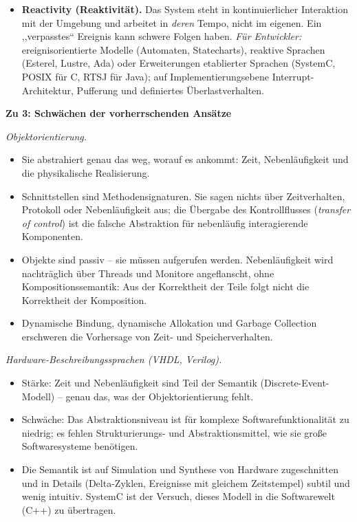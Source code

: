 \begin{loesung}
\begin{itemize}
          kontinuierliche und diskrete Anteile, synchrone und asynchrone Abläufe, blockierende und
          nichtblockierende Kommunikation, kontroll- und datenflussorientierte Sprachen.
          \emph{Für Entwickler:} Ein einziger Formalismus reicht nicht; erforderlich sind
          hierarchisch heterogene Modelle, eine sauber definierte Semantik an den Modellgrenzen und
          Co-Simulation.
    \item \textbf{Reactivity (Reaktivität).} Das System steht in kontinuierlicher Interaktion mit
          der Umgebung und arbeitet in \emph{deren} Tempo, nicht im eigenen. Ein ,,verpasstes``
          Ereignis kann schwere Folgen haben. \emph{Für Entwickler:} ereignisorientierte Modelle
          (Automaten, Statecharts), reaktive Sprachen (Esterel, Lustre, Ada) oder Erweiterungen
          etablierter Sprachen (SystemC, POSIX für C, RTSJ für Java); auf Implementierungsebene
          Interrupt-Architektur, Pufferung und definiertes Überlastverhalten.
\end{itemize}

\textbf{Zu 3: Schwächen der vorherrschenden Ansätze}

\emph{Objektorientierung.}
\begin{itemize}
    \item Sie abstrahiert genau das weg, worauf es ankommt: Zeit, Nebenläufigkeit und die
          physikalische Realisierung.
    \item Schnittstellen sind Methodensignaturen. Sie sagen nichts über Zeitverhalten, Protokoll
          oder Nebenläufigkeit aus; die Übergabe des Kontrollflusses (\emph{transfer of control})
          ist die falsche Abstraktion für nebenläufig interagierende Komponenten.
    \item Objekte sind passiv -- sie müssen aufgerufen werden. Nebenläufigkeit wird nachträglich
          über Threads und Monitore angeflanscht, ohne Kompositionssemantik: Aus der Korrektheit
          der Teile folgt nicht die Korrektheit der Komposition.
    \item Dynamische Bindung, dynamische Allokation und Garbage Collection erschweren die Vorhersage
          von Zeit- und Speicherverhalten.
\end{itemize}

\emph{Hardware-Beschreibungssprachen (VHDL, Verilog).}
\begin{itemize}
    \item Stärke: Zeit und Nebenläufigkeit sind Teil der Semantik (Discrete-Event-Modell) -- genau
          das, was der Objektorientierung fehlt.
    \item Schwäche: Das Abstraktionsniveau ist für komplexe Softwarefunktionalität zu niedrig; es
          fehlen Strukturierungs- und Abstraktionsmittel, wie sie große Softwaresysteme benötigen.
    \item Die Semantik ist auf Simulation und Synthese von Hardware zugeschnitten und in Details
          (Delta-Zyklen, Ereignisse mit gleichem Zeitstempel) subtil und wenig intuitiv.
          SystemC ist der Versuch, dieses Modell in die Softwarewelt (C++) zu übertragen.
\end{itemize}


\end{loesung}
